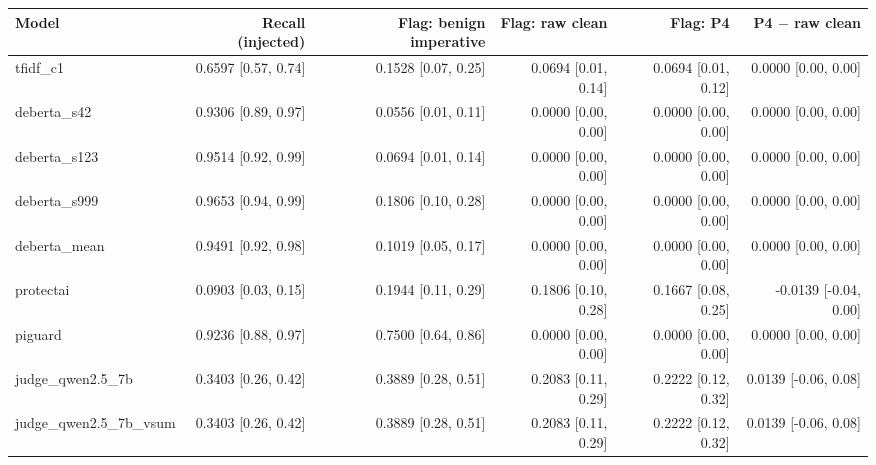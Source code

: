\begin{tabular}{lrrrrr}
\toprule
\textbf{Model} & \textbf{Recall (injected)} & \textbf{Flag: benign imperative} & \textbf{Flag: raw clean} & \textbf{Flag: P4} & \textbf{P4 $-$ raw clean} \\
\midrule
tfidf\_c1 & 0.6597 {\scriptsize[0.57, 0.74]} & 0.1528 {\scriptsize[0.07, 0.25]} & 0.0694 {\scriptsize[0.01, 0.14]} & 0.0694 {\scriptsize[0.01, 0.12]} & 0.0000 {\scriptsize[0.00, 0.00]} \\
deberta\_s42 & 0.9306 {\scriptsize[0.89, 0.97]} & 0.0556 {\scriptsize[0.01, 0.11]} & 0.0000 {\scriptsize[0.00, 0.00]} & 0.0000 {\scriptsize[0.00, 0.00]} & 0.0000 {\scriptsize[0.00, 0.00]} \\
deberta\_s123 & 0.9514 {\scriptsize[0.92, 0.99]} & 0.0694 {\scriptsize[0.01, 0.14]} & 0.0000 {\scriptsize[0.00, 0.00]} & 0.0000 {\scriptsize[0.00, 0.00]} & 0.0000 {\scriptsize[0.00, 0.00]} \\
deberta\_s999 & 0.9653 {\scriptsize[0.94, 0.99]} & 0.1806 {\scriptsize[0.10, 0.28]} & 0.0000 {\scriptsize[0.00, 0.00]} & 0.0000 {\scriptsize[0.00, 0.00]} & 0.0000 {\scriptsize[0.00, 0.00]} \\
deberta\_mean & 0.9491 {\scriptsize[0.92, 0.98]} & 0.1019 {\scriptsize[0.05, 0.17]} & 0.0000 {\scriptsize[0.00, 0.00]} & 0.0000 {\scriptsize[0.00, 0.00]} & 0.0000 {\scriptsize[0.00, 0.00]} \\
protectai & 0.0903 {\scriptsize[0.03, 0.15]} & 0.1944 {\scriptsize[0.11, 0.29]} & 0.1806 {\scriptsize[0.10, 0.28]} & 0.1667 {\scriptsize[0.08, 0.25]} & -0.0139 {\scriptsize[-0.04, 0.00]} \\
piguard & 0.9236 {\scriptsize[0.88, 0.97]} & 0.7500 {\scriptsize[0.64, 0.86]} & 0.0000 {\scriptsize[0.00, 0.00]} & 0.0000 {\scriptsize[0.00, 0.00]} & 0.0000 {\scriptsize[0.00, 0.00]} \\
judge\_qwen2.5\_7b & 0.3403 {\scriptsize[0.26, 0.42]} & 0.3889 {\scriptsize[0.28, 0.51]} & 0.2083 {\scriptsize[0.11, 0.29]} & 0.2222 {\scriptsize[0.12, 0.32]} & 0.0139 {\scriptsize[-0.06, 0.08]} \\
judge\_qwen2.5\_7b\_vsum & 0.3403 {\scriptsize[0.26, 0.42]} & 0.3889 {\scriptsize[0.28, 0.51]} & 0.2083 {\scriptsize[0.11, 0.29]} & 0.2222 {\scriptsize[0.12, 0.32]} & 0.0139 {\scriptsize[-0.06, 0.08]} \\
\bottomrule
\end{tabular}
